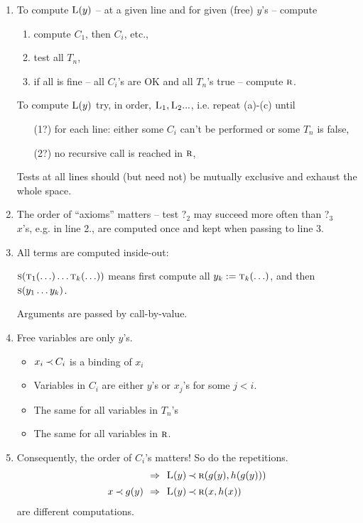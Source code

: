 \documentclass[leqno]{article}
\newcommand{\ina}{\hspace*{1em}}
\newcommand{\func}[1]{\mbox{\sc #1}}
\newcommand{\f}[1]{\func{#1}}
\begin{document}
\begin{enumerate}\MyLPar
\item 
To compute $\f L(y)$ -- at a given line and for given (free) $y$'s -- compute 
 \begin{enumerate}
  \item compute $C_1$, then $C_i$, etc.,
  \item  test all $T_n$,
  \item if all is fine -- all $C_i$'s are OK and all $T_n$'s true -- compute $\f r$.
 \end{enumerate}
To compute $\f L(y)$ try, in order, $\f L_1, \f L_2...$, i.e. repeat (a)-(c) until 
 \begin{itemize}
\item[(1?)] for each line: either some $C_i$ can't be performed or some $T_n$ is false, 
\item[(2?)] no recursive call is reached in $\f r$,
\end{itemize}
Tests at all lines should (but need not) be mutually exclusive and 
exhaust the whole space. 
\item The order of ``axioms'' matters -- test ?$_2$ may succeed more often than ?$_3$\\
 $x$'s, e.g. in line 2., are computed once and kept when passing to line 3.
\item All terms are computed inside-out: \vspace*{-1ex}
\begin{center}
$\f s(\f t_1(\ldots)\ldots \f t_k(\ldots))$ means
\ina first compute all $y_k:=\f t_k(\ldots)$, and then $\f s(y_1\ldots y_k)$.\vspace*{-1ex}
\end{center}
Arguments are passed by call-by-value.
\item Free variables are only $y$'s.
 \begin{itemize}
 \item $x_i\mathbin{\prec} C_i$ is a binding of $x_i$
 \item Variables in $C_i$ are either $y$'s or $x_j$'s for some $j<i$.
 \item The same for all variables in $T_n$'s
 \item The same for all variables in $\f r$.
 \end{itemize}
\item
Consequently, the order of $C_i$'s matters! So do the repetitions.
\begin{equation}
\begin{array}{r@{\ \ \impl\ \ }l}
 & \f L(y) \Incl \f r(g(y), h(g(y))) \\[1ex] %
x\Incl g(y) & \f L(y) \Incl \f r(x,h(x)) \end{array}
\end{equation}
are different computations.
\end{enumerate}
%
\end{document}

